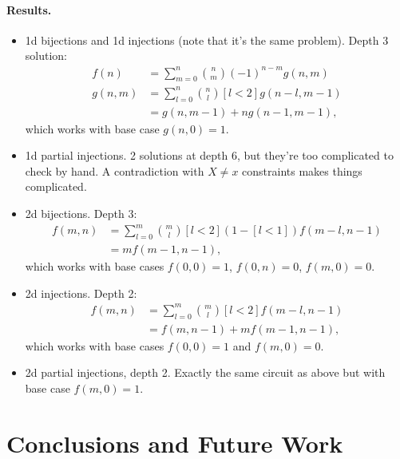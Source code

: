 \paragraph{Results.}
\begin{itemize}
  \item 1d bijections and 1d injections (note that it's the same problem). Depth
        3 solution:
        \begin{align*}
          f(n) &= \sum_{m=0}^n \binom{n}{m} (-1)^{n-m}g(n, m) \\
          g(n, m) &= \sum_{l=0}^n \binom{n}{l}[l < 2]g(n-l, m-1) \\
               &= g(n, m - 1) + ng(n - 1, m - 1),
        \end{align*}
        which works with base case $g(n, 0) = 1$.
  \item 1d partial injections. 2 solutions at depth 6, but they're too
        complicated to check by hand. A contradiction with $X \ne x$ constraints
        makes things complicated.
  \item 2d bijections. Depth 3:
        \begin{align*}
          f(m, n) &= \sum_{l=0}^m \binom{m}{l} [l < 2] (1 - [l < 1])f(m-l, n-1) \\
                  &= mf(m-1, n-1),
        \end{align*}
        which works with base cases $f(0, 0) = 1$, $f(0, n) = 0$, $f(m, 0) = 0$.
  \item 2d injections. Depth 2:
        \begin{align*}
          f(m, n) &= \sum_{l=0}^m \binom{m}{l}[l<2]f(m-l, n-1) \\
                  &= f(m, n-1) + mf(m-1, n-1),
        \end{align*}
        which works with base cases $f(0, 0) = 1$ and $f(m, 0) = 0$.
  \item 2d partial injections, depth 2. Exactly the same circuit as above but
        with base case $f(m, 0) = 1$.
\end{itemize}

\section{Conclusions and Future Work}

